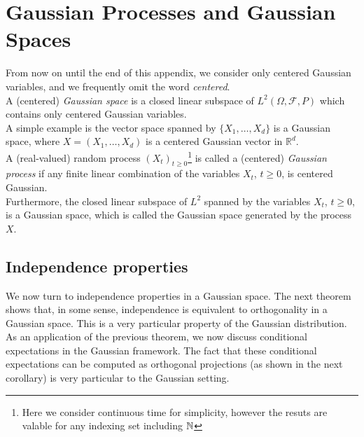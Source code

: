 \documentclass[../Main.tex]{subfiles}
\begin{document}
\section{Gaussian Processes and Gaussian Spaces}
From now on until the end of this appendix, we consider only centered Gaussian variables, and we frequently omit the word \textit{centered}.\\
A (centered) \emph{Gaussian space} is a closed linear subspace of $L^2(\Omega,\mathcal F,P)$ which contains only centered Gaussian variables. \\
A simple example is the vector space spanned by $\{X_1,\dots,X_d\}$ is a Gaussian space, where $X=(X_1,\dots,X_d)$ is a centered Gaussian vector in $\mathbb R^d$. \\
A (real-valued) random process $(X_t)_{t\geq 0}$\footnote{Here we consider continuous time for simplicity, however the resuts are valable for any indexing set including $\mathbb{N}$} is called a (centered) \emph{Gaussian process} if any finite linear combination of the variables $X_t$, $t\geq 0$, is centered Gaussian. \\ 
Furthermore, the closed linear subspace of $L^2$ spanned by the variables $X_t$, $t\geq 0$, is a Gaussian space, which is called the Gaussian space generated by the process $X$.
\subsection{Independence properties}
We now turn to independence properties in a Gaussian space. The next theorem shows that, in some sense, independence is equivalent to orthogonality in a Gaussian space. This is a very particular property of the Gaussian distribution.
As an application of the previous theorem, we now discuss conditional expectations in the Gaussian framework. The fact that these conditional expectations can be computed as orthogonal projections (as shown in the next corollary) is very particular to the Gaussian setting.
\end{document}
